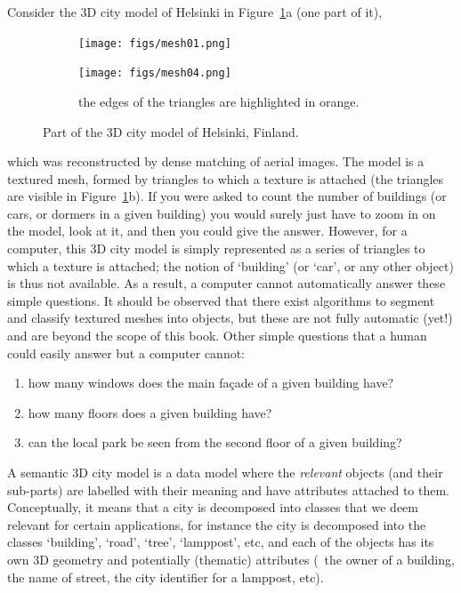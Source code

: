 Consider the 3D city model of Helsinki in Figure~\ref{fig:mesh}a (one part of it),
\begin{figure}
  \centering
  \begin{subfigure}[b]{0.48\linewidth}
    \centering
    \texttt{[image: figs/mesh01.png]}
    \caption{}
  \end{subfigure}
  \begin{subfigure}[b]{0.48\linewidth}
    \centering
    \texttt{[image: figs/mesh04.png]}
    \caption{the edges of the triangles are highlighted in orange.}
  \end{subfigure}
\caption{Part of the 3D city model of Helsinki, Finland.}%
\label{fig:mesh}
\end{figure}
which was reconstructed by dense matching of aerial images.
The model is a textured mesh, formed by triangles to which a texture is attached (the triangles are visible in Figure~\ref{fig:mesh}b).
If you were asked to count the number of buildings (or cars, or dormers in a given building) you would surely just have to zoom in on the model, look at it, and then you could give the answer.
However, for a computer, this 3D city model is simply represented as a series of triangles to which a texture is attached; the notion of `building' (or `car', or any other object) is thus not available.
As a result, a computer cannot automatically answer these simple questions.
It should be observed that there exist algorithms to segment and classify textured meshes into objects, but these are not fully automatic (yet!) and are beyond the scope of this book.
Other simple questions that a human could easily answer but a computer cannot:
\begin{enumerate}
  \item how many windows does the main façade of a given building have?
  \item how many floors does a given building have?
  \item can the local park be seen from the second floor of a given building?
\end{enumerate}

%

A semantic 3D city model is a data model where the \emph{relevant} objects (and their sub-parts) are labelled with their meaning and have attributes attached to them.
Conceptually, it means that a city is decomposed 
into classes that we deem relevant for certain applications, for instance the city is decomposed into the classes `building', `road', `tree', `lamppost', etc, and each of the objects has its own 3D geometry and potentially (thematic) attributes (\eg\ the owner of a building, the name of street, the city identifier for a lamppost, etc).

